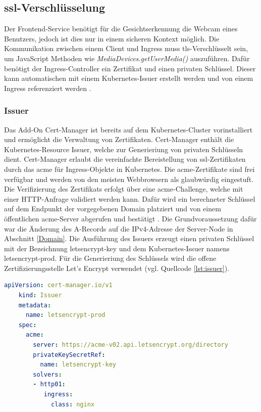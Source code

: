 \subsection{\acs{ssl}-Verschlüsselung}

Der Frontend-Service benötigt für die Gesichtserkennung die Webcam eines Benutzers, jedoch ist dies nur in einem sicheren Kontext möglich.
Die Kommunikation zwischen einem Client und Ingress muss \acs{tls}-Verschlüsselt sein, um JavaScript Methoden wie \textit{MediaDevices.getUserMedia()} auszuführen.
Dafür benötigt der Ingress-Controller ein Zertifikat und einen privaten Schlüssel.
Dieser kann automatischen mit einem Kubernetes-Issuer erstellt werden und von einem Ingress referenziert werden \cite{certmanager}.

\subsubsection{Issuer}
Das Add-On Cert-Manager ist bereits auf dem Kubernetes-Cluster vorinstalliert und ermöglicht die Verwaltung von Zertifikaten.
Cert-Manager enthält die Kubernetes-Resource Issuer, welche zur Generieriung von privaten Schlüsseln dient.
Cert-Manager erlaubt die vereinfachte Bereistellung von \ac{ssl}-Zertifikaten durch das \ac{acme} für Ingress-Objekte in Kubernetes.
Die \acs{acme}-Zertifikate sind frei verfügbar und werden von den meisten Webbrowsern als glaubwürdig eingestuft.
Die Verifizierung des Zertifikats erfolgt über eine \acs{acme}-Challenge, welche mit einer HTTP-Anfrage validiert werden kann.
Dafür wird ein berechneter Schlüssel auf dem Endpunkt der vorgegebenen Domain platziert und von einem öffentlichen \acs{acme}-Server abgerufen und bestätigt \cite{certmanageracme}.
Die Grundvoraussetzung dafür war die Änderung des A-Records auf die IPv4-Adresse der Server-Node in Abschnitt \ref{Domain}.
Die Ausführung des Issuers erzeugt einen privaten Schlüssel mit der Bezeichnung letsencrypt-key und dem Kubernetes-Issuer namens letsencrypt-prod. 
Für die Generieriung des Schlüssels wird die offene Zertifizierungsstelle Let's Encrypt verwendet \cite{letsencrypt} (vgl. Quellcode \ref{lst:issuer}). 

\begin{lstlisting}[caption={issuer.yaml \cite{certmanageracme} },captionpos=b,label={lst:issuer},language=yaml]
    apiVersion: cert-manager.io/v1
    kind: Issuer
    metadata:
      name: letsencrypt-prod
    spec:
      acme:
        server: https://acme-v02.api.letsencrypt.org/directory
        privateKeySecretRef:
          name: letsencrypt-key
        solvers:
        - http01:
           ingress:
             class: nginx

\end{lstlisting}



